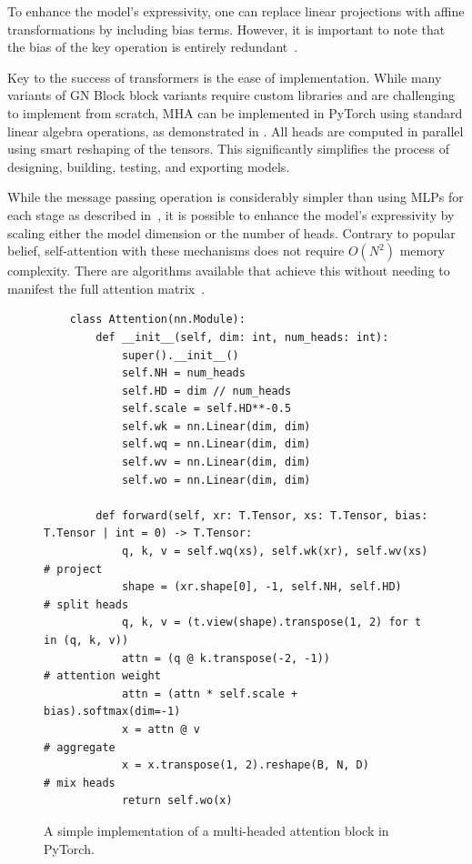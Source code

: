 To enhance the model's expressivity, one can replace linear projections with affine transformations by including bias terms. However, it is important to note that the bias of the key operation is entirely redundant~\cite{RoleBiasTerms}.

Key to the success of transformers is the ease of implementation.
While many variants of GN Block block variants require custom libraries and are challenging to implement from scratch, MHA can be implemented in PyTorch using standard linear algebra operations, as demonstrated in .
All heads are computed in parallel using smart reshaping of the tensors.
This significantly simplifies the process of designing, building, testing, and exporting models.

While the message passing operation is considerably simpler than using MLPs for each stage as described in~, it is possible to enhance the model's expressivity by scaling either the model dimension or the number of heads.
Contrary to popular belief, self-attention with these mechanisms does not require $O(N^2)$ memory complexity. There are algorithms available that achieve this without needing to manifest the full attention matrix~\cite{SelfattentionDoesNot, FlashAttentionFastMemoryEfficient}.

\begin{figure}
    \centering
    \scriptsize
    \begin{verbatim}
    class Attention(nn.Module):
        def __init__(self, dim: int, num_heads: int):
            super().__init__()
            self.NH = num_heads
            self.HD = dim // num_heads
            self.scale = self.HD**-0.5
            self.wk = nn.Linear(dim, dim)
            self.wq = nn.Linear(dim, dim)
            self.wv = nn.Linear(dim, dim)
            self.wo = nn.Linear(dim, dim)

        def forward(self, xr: T.Tensor, xs: T.Tensor, bias: T.Tensor | int = 0) -> T.Tensor:
            q, k, v = self.wq(xs), self.wk(xr), self.wv(xs)              # project
            shape = (xr.shape[0], -1, self.NH, self.HD)                  # split heads
            q, k, v = (t.view(shape).transpose(1, 2) for t in (q, k, v))
            attn = (q @ k.transpose(-2, -1))                             # attention weight
            attn = (attn * self.scale + bias).softmax(dim=-1)
            x = attn @ v                                                 # aggregate
            x = x.transpose(1, 2).reshape(B, N, D)                       # mix heads
            return self.wo(x)
    \end{verbatim}
    \caption{A simple implementation of a multi-headed attention block in PyTorch.}
    \label{code:attention}
\end{figure}

